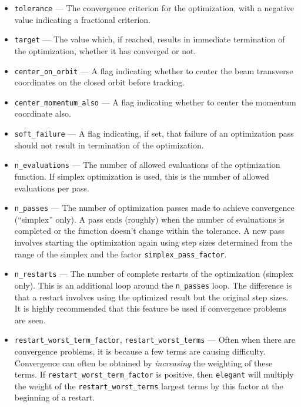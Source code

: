 \documentclass[11pt]{article}
\begin{document}
\begin{itemize}
\item \verb|tolerance| --- The convergence criterion for the optimization, with a negative value indicating
a fractional criterion.
\item \verb|target| --- The value which, if reached, results in immediate termination of the optimization,
whether it has converged or not.

\item \verb|center_on_orbit| --- A flag indicating whether to center the beam transverse coordinates on the closed orbit
  before tracking.

\item \verb|center_momentum_also| --- A flag indicating whether to center the momentum coordinate also.

\item \verb|soft_failure| --- A flag indicating, if set, that failure of an optimization pass should not
result in termination of the optimization.

\item \verb|n_evaluations| --- The number of allowed evaluations of
the optimization function.  If simplex optimization is used, this is
the number of allowed evaluations per pass.

\item \verb|n_passes| --- The number of optimization passes made to
achieve convergence (``simplex'' only).  A pass ends (roughly) when
the number of evaluations is completed or the function doesn't change
within the tolerance.  A new pass involves starting the optimization
again using step sizes determined from the range of the simplex and
the factor \verb|simplex_pass_factor|.

\item \verb|n_restarts| --- The number of complete restarts of the
optimization (simplex only).  This is an additional loop around the
\verb|n_passes| loop.  The difference is that a restart involves using
the optimized result but the original step sizes.  It is highly
recommended that this feature be used if convergence problems are seen.

\item \verb|restart_worst_term_factor|, \verb|restart_worst_terms| --- Often
when there are convergence problems, it is because a few terms are causing 
difficulty.  Convergence can often be obtained by {\em increasing} the weighting
of these terms.  If  \verb|restart_worst_term_factor| is positive, then \verb|elegant|
will multiply the weight of the \verb|restart_worst_terms| largest terms by this
factor at the beginning of a restart.


\end{itemize}
\end{document}
